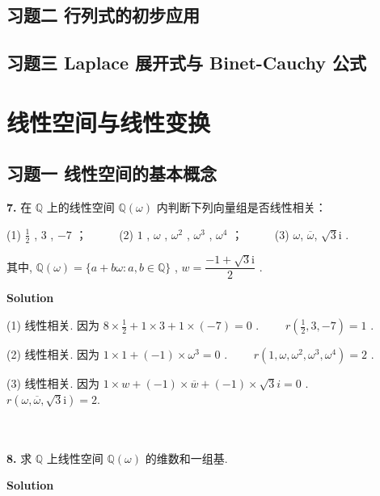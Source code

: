 \documentclass[11pt,a4paper,openany,oneside]{book}
\def\I{\mathrm{i}}
\newcommand\Solution{\noindent\textbf{\textsf{Solution}}\par\medskip}
\begin{document}
\section{习题二 \quad 行列式的初步应用}
\section{习题三 \quad Laplace 展开式与 Binet-Cauchy 公式}

\chapter{线性空间与线性变换}
\section{习题一 \quad 线性空间的基本概念}


\begin{myexample}
\textbf{7.} 
在  $ \mathbb{Q} $ 上的线性空间  $ \mathbb{Q}(\omega) $ 内判断下列向量组是否线性相关： 

(1)  $ \frac{1}{2} $ ,  $ 3 $ ,  $ -7 $ ；  \ \ \ \ \ (2)  $ 1 $ ,  $ \omega $ ,  $ \omega^2 $ ,  $ \omega^3 $ ,  $ \omega^4 $ ；  \ \ \ \ \ (3)  $ \omega$, $\overline{\omega}$, $\sqrt{3}\I $  . 

其中,  $ \mathbb{Q} (\omega) = \{a+b\omega: a, b \in \mathbb{Q} \} $ ,  $ w = \dfrac{-1+\sqrt{3}\I}{2} $ . 
\end{myexample}
\Solution

(1) 线性相关. 因为 $ 8\times \frac{1}{2} + 1\times3 + 1\times(-7) = 0 $ . \ \ \ \  $ r(\tfrac{1}{2}, 3, -7) = 1 $ .

(2) 线性相关. 因为 $ 1\times1 + (-1)\times \omega^3 = 0 $  . \ \ \ \  $ r( 1, \omega, \omega^2, \omega^3, \omega^4)=2 $ . 

(3) 线性相关. 因为 $ 1\times w + (-1)\times \overline{w} + (-1)\times \sqrt{3}i = 0 $ . \ \ \ \  $ r(\omega, \overline{\omega}, \sqrt{3}\I) = 2. $   \\  \\  \\




\begin{myexample}
	\textbf{8.}
求 $ \mathbb{Q} $ 上线性空间 $ \mathbb{Q}(\omega) $ 的维数和一组基.  

\end{myexample}
\Solution
\end{document}
